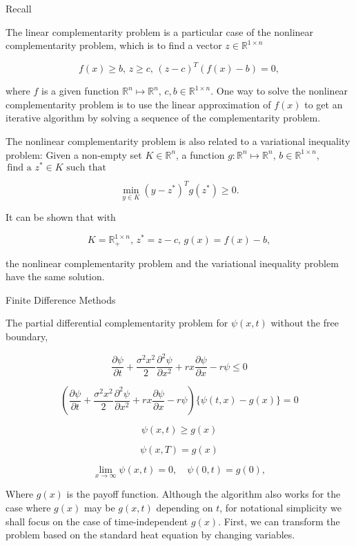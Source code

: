 \documentclass{beamer}
\begin{document}
\begin{frame}{Recall}

    {\footnotesize \footnotesize
     The linear complementarity problem is a particular case of the nonlinear complementarity problem, which is to find a vector \( z \in \mathbb{R}^{1 \times n} \)

\[
f(x) \geq b, \, z \geq c, \, (z - c)^T(f(x) - b) = 0,
\]

where \( f \) is a given function \( \mathbb{R}^n \longmapsto \mathbb{R}^n, \, c, b \in \mathbb{R}^{1 \times n} \). 
One way to solve the nonlinear complementarity problem is to use the linear approximation of \( f(x) \) to get
an iterative algorithm by solving a sequence of the complementarity problem.

\vspace{1em}
 \pause The nonlinear complementarity problem is also related to a variational inequality problem: 
Given a non-empty set \( K \in \mathbb{R}^n \), a function $g: \mathbb{R}^n \longmapsto \mathbb{R}^n, \, b \in \mathbb{R}^{1 \times n},$
\(  \, \text{find a } 
z^* \in K \text{ such that} \)

\[
\min_{y \in K}(y - z^*)^T g(z^*) \geq 0.
\]

It can be shown that with

\[
K = \mathbb{R}_+^{1 \times n}, \, z^* = z - c, \, g(x) = f(x) - b,
\]

the nonlinear complementarity problem and the variational inequality problem have the same solution.

    }
    
\end{frame}


\begin{frame}{Finite Difference Methods}

    {\footnotesize \footnotesize
    The partial differential complementarity problem for \(\psi(x,t)\) without the free boundary,

    \[
    \frac{\partial \psi}{\partial t} + \frac{\sigma^2 x^2}{2} \frac{\partial^2 \psi}{\partial x^2} + rx \frac{\partial \psi}{\partial x} - r\psi \leq 0
    \]

    \[
    \left( \frac{\partial \psi}{\partial t} + \frac{\sigma^2 x^2}{2} \frac{\partial^2 \psi}{\partial x^2} + rx \frac{\partial \psi}{\partial x} - r\psi \right) \{ \psi(t,x) - g(x) \} = 0
    \]

    \[
    \psi(x,t) \geq g(x)
    \]

    \[
    \psi(x,T) = g(x)
    \]

    \[
    \lim_{x \to \infty} \psi(x,t) = 0, \quad \psi(0,t) = g(0),
    \]

    \pause Where $g(x)$ is the payoff function. Although the algorithm also works for the case where $g(x)$ may be $g(x,t)$ depending on $t$,
    for notational simplicity we shall focus on the case of time-independent $g(x)$. 
    First, we can transform the problem based on the standard heat equation by changing variables. 

        }
    
\end{frame}
\end{document}
